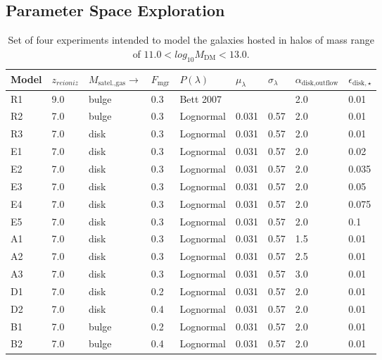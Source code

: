 \documentclass[usenatbib]{mn2e}
\begin{document}
\subsection{Parameter Space Exploration}
\label{sec:method:paramspace}
\begin{table}\tiny
\centering
\resizebox{7in}{!} {
\begin{tabular}{|l|l|l|l|l|l|l|l|l|}
\hline
\hline
Model  &  $z_{reioniz}$ &  $M_{\text{satel.,gas}}\to$  & $F_{\text{mgr}}$ & $P(\lambda)$  &  $\mu_\lambda$
 & $\sigma_\lambda$  & $\alpha_{\text{disk,outflow}}$ & $\epsilon_{\text{disk},\star}$ \\
\hline
\hline
R1 & 9.0 &  bulge & 0.3 &Bett 2007 & &  & 2.0 & 0.01 \\
R2 & 7.0 &  bulge & 0.3 &Lognormal & 0.031 & 0.57 & 2.0 & 0.01 \\
R3 & 7.0 &  disk & 0.3 &Lognormal & 0.031  & 0.57 & 2.0 & 0.01 \\
\hline
E1 & 7.0 &  disk & 0.3 &Lognormal & 0.031 & 0.57 & 2.0 & 0.02 \\
E2 & 7.0 &  disk & 0.3 &Lognormal & 0.031 & 0.57 & 2.0 & 0.035 \\
E3 & 7.0 &  disk & 0.3 &Lognormal & 0.031 & 0.57 & 2.0 & 0.05 \\
E4 & 7.0 &  disk & 0.3 &Lognormal & 0.031 & 0.57 & 2.0 & 0.075 \\
E5 & 7.0 &  disk & 0.3 &Lognormal & 0.031 & 0.57 & 2.0 & 0.1 \\
\hline
A1 & 7.0 &  disk & 0.3 &Lognormal & 0.031 & 0.57 & 1.5 & 0.01 \\
A2 & 7.0 &  disk & 0.3 &Lognormal & 0.031 & 0.57 & 2.5 & 0.01 \\
A3 & 7.0 &  disk & 0.3 &Lognormal & 0.031 & 0.57 & 3.0 & 0.01 \\
\hline
D1 & 7.0 &  disk & 0.2 &Lognormal & 0.031 & 0.57 & 2.0 & 0.01 \\
D2 & 7.0 &  disk & 0.4 &Lognormal & 0.031 & 0.57 & 2.0 & 0.01 \\
\hline
B1 & 7.0 &  bulge & 0.2 &Lognormal & 0.031 & 0.57 & 2.0 & 0.01 \\
B2 & 7.0 &  bulge & 0.4 &Lognormal & 0.031 & 0.57 & 2.0 & 0.01 \\
\hline
\hline
\end{tabular}
}
\caption{Set of four experiments intended to model the galaxies hosted
  in  halos of mass range of $11.0<log_{10}
  M_{\text{DM}}<13.0$.\label{tab:runs}}  
\end{table}
\end{document}

